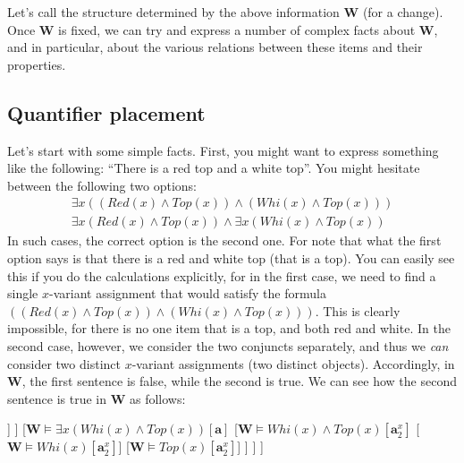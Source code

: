 Let's call the structure determined by the above information $\mathbf{W}$ (for a change). Once $\mathbf{W}$ is fixed, we can try and express a number of complex facts about $\mathbf{W}$, and in particular, about the various relations between these items and their properties. 

\subsection{Quantifier placement}

Let's start with some simple facts. First, you might want to express something like the following: ``There is a red top and a white top''. You might hesitate between the following two options: 
\begin{gather*}
	\exists x ((Red (x) \wedge Top(x)) \wedge (Whi(x) \wedge Top(x)))\\
	\exists x (Red(x) \wedge Top(x)) \wedge \exists x (Whi(x) \wedge Top(x))
\end{gather*}
In such cases, the correct option is the second one. For note that what the first option says is that there is a red and white top (that is a top). You can easily see this if you do the calculations explicitly, for in the first case, we need to find a single $x$-variant assignment that would satisfy the formula $((Red (x) \wedge Top(x)) \wedge (Whi(x) \wedge Top(x)))$. This is clearly impossible, for there is no one item that is a top, and both red and white. In the second case, however, we consider the two conjuncts separately, and thus we \textit{can} consider two distinct $x$-variant assignments (two distinct objects). Accordingly, in $\mathbf{W}$, the first sentence is false, while the second is true. We can see how the second sentence is true in $\mathbf{W}$ as follows:

\begin{center}
\begin{forest}
	[{$\mathbf{W} \models \exists x (Red(x) \wedge Top(x)) \wedge \exists x (Whi(x) \wedge Top(x))[\mathbf{a}]$}
		[{$\mathbf{W} \models \exists x (Red(x) \wedge Top(x)) [\mathbf{a}]$}
			[{$\mathbf{W} \models Red(x) \wedge Top(x) [\mathbf{a}^x_1]$}
				[{$\mathbf{W} \models Red(x) [\mathbf{a}^x_1]$}]
				[{$\mathbf{W} \models Top(x) [\mathbf{a}^x_1]$}]
			]
		]
		[{$\mathbf{W} \models \exists x (Whi(x) \wedge Top(x)) [\mathbf{a}]$}
			[{$\mathbf{W} \models Whi(x) \wedge Top(x) [\mathbf{a}^x_2]$}
				[{$\mathbf{W} \models Whi(x) [\mathbf{a}^x_2]$}]
				[{$\mathbf{W} \models Top(x) [\mathbf{a}^x_2]$}]
			]
		]
	]
\end{forest}
\end{center}


